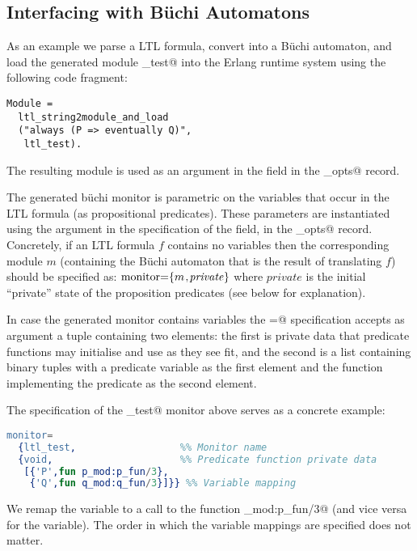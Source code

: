 \documentclass[a4paper]{article}
\begin{document}
\subsection{Interfacing with B\"uchi Automatons}
As an example we parse a LTL formula, convert into a B\"uchi automaton,
and load the generated module \lstinline@ltl_test@
into the Erlang runtime system
using the following code fragment:
\begin{lstlisting}
Module = 
  ltl_string2module_and_load
  ("always (P => eventually Q)", 
   ltl_test).
\end{lstlisting}

The resulting module is used as an argument in the \lstinline@monitor@ field
in the \lstinline@mce_opts@ record. 

The generated b\"uchi monitor is parametric on the 
variables that occur in the LTL formula (as propositional predicates). 
These parameters are instantiated using the argument in the 
specification of the \lstinline@monitor@ field, in the 
\lstinline@mce_opts@ record. Concretely, if an LTL formula $f$
contains no variables then the corresponding module $m$
(containing the B\"uchi automaton that is the result of translating $f$)
should be specified as:
$\mbox{\lstinline@monitor=\{@}m\mbox{\lstinline@,@}\mathit{private}
 \mbox{\lstinline@\}@}$
where $\mathit{private}$ is the initial ``private'' state of
the proposition predicates (see below for explanation).

In case the generated monitor contains variables
the \lstinline@monitor=@ specification accepts as argument
a tuple containing two elements:
the first is private data that predicate functions may initialise
and use as they see fit, and the second 
is a list containing binary tuples with a predicate variable
as the first element and the function implementing
the predicate as the second element.

The specification of the \lstinline@ltl_test@ monitor above serves
as a concrete example:
\begin{lstlisting}[language=Erlang]
monitor=
  {ltl_test,                  %% Monitor name
  {void,                      %% Predicate function private data
   [{'P',fun p_mod:p_fun/3},
    {'Q',fun q_mod:q_fun/3}]}} %% Variable mapping
\end{lstlisting}
We remap the \lstinline@P@ variable to a call to 
the function \lstinline@p_mod:p_fun/3@ (and vice versa for 
the \lstinline@Q@ variable). The order in which the variable
mappings are specified does not matter.
\end{document}
